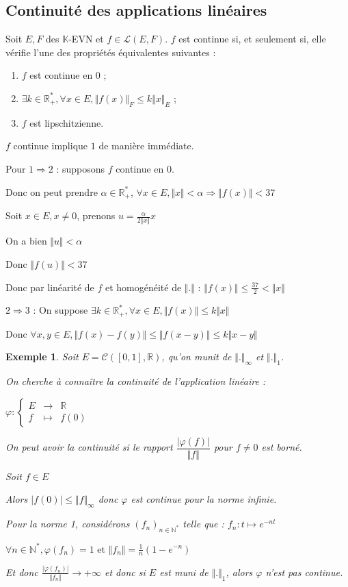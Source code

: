\documentclass[a4paper,12pt]{book}
\newcommand{\Thr}[2]{\begin{tcolorbox}[sharp corners, colback=white,colframe=red!90!black!75, title=Théorème : #1]#2\end{tcolorbox}}
\newcommand{\Pre}[1]{\begin{tcolorbox}[sharp corners, colback=white,colframe=green!60!green!30!black!75, title=Preuve]#1\end{tcolorbox}}
\newtheorem{Exe}{Exemple}[section]
\def\R{\mathbb{R}}
\def\N{\mathbb{N}}
\def\K{\mathbb{K}}
\begin{document}
\subsection{Continuité des applications linéaires}
\Thr{Critère de continuité des applications linéaires}{Soit $E, F$ des $\K$-EVN et $f\in\mathcal{L}(E,F)$. $f$ est continue si, et seulement si, elle vérifie l'une des propriétés équivalentes suivantes :\begin{enumerate}
\item $f$ est continue en $0$ ;
\item $\exists k\in\R_+^*,\forall x\in E, \Vert f(x)\Vert_F\leq k\Vert x\Vert_E$ ;
\item $f$ est lipschitzienne.\end{enumerate}}
\Pre{$f$ continue implique $1$ de manière immédiate. \par Pour $1\Rightarrow 2$ : supposons $f$ continue en $0$. \par Donc on peut prendre $\alpha\in\R_+^*$, $\forall x\in E, \Vert x\Vert<\alpha\Rightarrow\Vert f(x)\Vert < 37$ \par Soit $x\in E, x\neq 0$, prenons $u=\frac{\alpha}{2\Vert x\Vert}x$ \par On a bien $\Vert u\Vert<\alpha$ \par Donc $\Vert f(u)\Vert<37$ \par Donc par linéarité de $f$ et homogénéité de $\Vert.\Vert$ : $\Vert f(x)\Vert\leq\frac{37}{2}<\Vert x\Vert$
\par $2\Rightarrow 3$ : On suppose $\exists k\in\R_+^*, \forall x\in E,\Vert f(x)\Vert \leq k\Vert x\Vert$ \par Donc $\forall x,y\in E, \Vert f(x)-f(y)\Vert\leq \Vert f(x-y)\Vert\leq k\Vert x-y\Vert$}
\begin{Exe}
Soit $E=\mathcal{C}([0,1],\R)$, qu'on munit de $\Vert.\Vert_\infty$ et $\Vert.\Vert_1$. \par On cherche à connaître la continuité de l'application linéaire : \par $\varphi:\left\{\begin{array}{rcl} E & \to & \R \\ f & \mapsto & f(0) \end{array}\right.$ \par On peut avoir la continuité si le rapport $\dfrac{\vert\varphi(f)\vert}{\Vert f\Vert}$ pour $f\neq 0$ est borné. \par Soit $f\in E$\par Alors $\vert f(0)\vert \leq \Vert f\Vert_\infty$ donc $\varphi$ est continue pour la norme infinie.
\par Pour la norme 1, considérons $(f_n)_{n\in\N^*}$ telle que : $f_n : t\mapsto e^{-nt}$ \par $\forall n\in\N^*,\varphi(f_n)=1 \text{ et }\Vert f_n\Vert = \frac{1}{n}(1-e^{-n})$ \par Et donc $\frac{\vert \varphi(f_n)\vert}{\Vert f_n\Vert}\to +\infty$ et donc si $E$ est muni de $\Vert.\Vert_1$, alors $\varphi$ n'est pas continue.\end{Exe}
\end{document}
